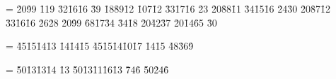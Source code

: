 \setbox\boxFF=          %
\vbox{\ofi
{} {\h{20}\h{99}}
  {\h{119}}
  {\h{32}\h{16}\h{16}
	\h{39}}
 {\h{18}\h{89}\h{12}
	}
  {\h{107}\h{12}}
 {\h{33}\h{17}\h{16}
	\h{23}}
 {\h{20}\h{88}\h{11}
	}
  {\h{34}\h{15}\h{16}
         \h{24}\h{30}}
 {\h{20}\h{87}\h{12}
        }
  {\h{33}\h{16}\h{16}
         \h{26}\h{28}}
 {\h{20}\h{99}}
 {\h{68}\h{17}\h{34}}
 {\h{34}\s{\t}\h{18}}
 {\h{20}\h{42}\s{\t}\h{37}}
 {\h{20}\h{14}\h{65}}
 {\h{30}}
\vskip 3mm
}


\setbox\boxGG=
\vbox{\ofi
{} {\h{45}\h{15}\h{14}\h{13}
	\h{14}\h{14}\h{15}}
 {\h{45}\h{15}\h{14}\h{10}\h{17}
	 \h{14}\h{15}}
  {\h{48}\h{36}\h{9}}
\vskip 3mm
}


\setbox\boxHH=
\vbox{\ofi
{} {\h{50}\h{13}\h{13}\h{14}
       \h{13}}
 {\h{50}\h{13}\h{11}\h{16}\h{13}
       }
 {\h{74}\h{6}}
 {\h{50}\h{24}\h{6}}
\vskip 3mm
}

 

